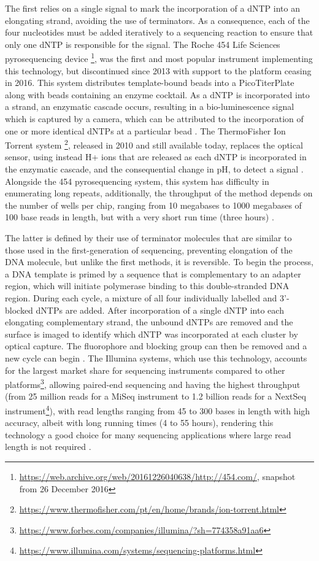 The first relies on a single signal to mark the incorporation of a dNTP into an elongating strand, avoiding the use of terminators. 
As a consequence, each of the four nucleotides must be added iteratively to a sequencing reaction to ensure that only one dNTP is responsible for the signal. 
The Roche 454 Life Sciences pyrosequencing device \footnote{\url{https://web.archive.org/web/20161226040638/http://454.com/}, snapshot from 26 December 2016}, was the first and most popular instrument implementing this technology, but discontinued since 2013 with support to the platform ceasing in 2016. 
This system distributes template-bound beads into a PicoTiterPlate along with beads containing an enzyme cocktail. 
As a dNTP is incorporated into a strand, an enzymatic cascade occurs, resulting in a bio-luminescence signal which is captured by a camera, which can be attributed to the incorporation of one or more identical dNTPs at a particular bead \citep{goodwin_coming_2016}. 
The ThermoFisher Ion Torrent system \footnote{\url{https://www.thermofisher.com/pt/en/home/brands/ion-torrent.html}}, released in 2010 and still available today, replaces the optical sensor, using instead  H+ ions that are released as each dNTP is incorporated in the enzymatic cascade, and the consequential change in pH, to detect a signal \citep{goodwin_coming_2016}. 
Alongside the 454 pyrosequencing system, this system has difficulty in enumerating long repeats, additionally, the throughput of the method depends on the number of wells per chip, ranging from 10 megabases to 1000 megabases of 100 base reads in length, but with a very short run time (three hours) \citep{hagemann_overview_2015, loman_performance_2012}.

The latter is defined by their use of terminator molecules that are similar to those used in the first-generation of sequencing, preventing elongation of the DNA molecule, but unlike the first methods, it is reversible. 
To begin the process, a DNA template is primed by a sequence that is complementary to an adapter region, which will initiate polymerase binding to this double-stranded DNA region. 
During each cycle, a mixture of all four individually labelled and 3'-blocked dNTPs are added. 
After incorporation of a single dNTP into each elongating complementary strand, the unbound dNTPs are removed and the surface is imaged to identify which dNTP was incorporated at each cluster by optical capture. 
The fluorophore and blocking group can then be removed and a new cycle can begin \citep{goodwin_coming_2016}. 
The Illumina systems, which use this technology, accounts for the largest market share for sequencing instruments compared to other platforms\footnote{\url{https://www.forbes.com/companies/illumina/?sh=774358a91aa6}}, allowing paired-end sequencing and having the highest throughput (from 25 million reads for a MiSeq instrument to  1.2 billion reads for a NextSeq instrument\footnote{\url{https://www.illumina.com/systems/sequencing-platforms.html}}), with read lengths ranging from 45 to 300 bases in length with high accuracy, albeit with long running times (4 to 55 hours), rendering this technology a good choice for many sequencing applications where large read length is not required \citep{loman_performance_2012, gupta_chapter_2014, hagemann_overview_2015}.

